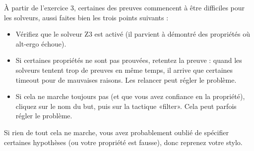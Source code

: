 \documentclass[11pt,answers]{exam}
\begin{document}
À partir de l’exercice 3, certaines des preuves commencent à être difficiles pour les solveurs, aussi faites bien les trois points suivants :
\begin{itemize}
    \item Vérifiez que le solveur Z3 est activé (il parvient à démontré des propriétés où alt-ergo échoue).
    \item Si certaines propriétés ne sont pas prouvées, retentez la preuve : quand les solveurs tentent trop de preuves en même temps, il arrive que certaines timeout pour de mauvaises raisons. Les relancer peut régler le problème.
    \item Si cela ne marche toujours pas (et que vous avez confiance en la propriété), cliquez sur le nom du but, puis sur la tactique «filter». Cela peut parfois régler le problème.
\end{itemize}

Si rien de tout cela ne marche, vous avez probablement oublié de spécifier certaines hypothèses (ou votre propriété est fausse), donc reprenez votre stylo.
\end{document}
